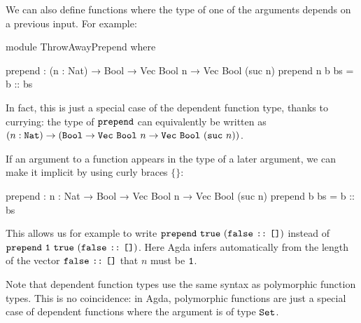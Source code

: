 \documentclass[a4paper,UKenglish]{tufte-handout}
\theoremstyle{definition}
\newcommand\prim[1]{{\AgdaPrimitive{#1}}}
\newcommand\ty[1]{{{\prim{Set}}_{#1}}}
\newcommand\fun[1]{{\AgdaFunction{#1}}}
\newcommand\data[1]{{\AgdaFunction{#1}}}
\newcommand\con[1]{{\AgdaInductiveConstructor{#1}}}
\newcommand\lit[1]{{\AgdaNumber{#1}}}
\newcommand\Nat{\data{Nat}}
\newcommand\suc{\con{suc}}
\newcommand\Bool{\data{Bool}}
\newcommand\true{\con{true}}
\newcommand\false{\con{false}}
\newcommand\nil{\con{[]}}
\newcommand\cons{\con{::}}
\begin{document}
We can also define functions where the type of one of the arguments
depends on a previous input. For example:
\begin{code}[hide]
  module ThrowAwayPrepend where
\end{code}
\begin{code}[number]
    prepend : (n : Nat) → Bool
            → Vec Bool n → Vec Bool (suc n)
    prepend n b bs = b :: bs
\end{code}
In fact, this is just a special case of the dependent function type,
thanks to currying: the type of $\fun{prepend}$ can equivalently be
written as $(n : \Nat) \to (\Bool \to \data{Vec}\ \Bool\ n \to
\data{Vec}\ \Bool\ (\suc\ n))$.

If an argument to a function appears in the type of a later argument,
we can make it implicit by using curly braces $\{\}$:
\begin{code}[number]
  prepend : {n : Nat} → Bool
          → Vec Bool n → Vec Bool (suc n)
  prepend b bs = b :: bs
\end{code}
This allows us for example to write
$\fun{prepend}\ \true\ (\false\ \cons\ \nil)$ instead of
$\fun{prepend}\ \lit{1}\ \true\ (\false\ \cons\ \nil)$. Here Agda infers
automatically from the length of the vector $\false\ \cons\ \nil$ that
$n$ must be $\lit{1}$.

Note that dependent function types use the same syntax as polymorphic
function types. This is no coincidence: in Agda, polymorphic functions
are just a special case of dependent functions where the argument is
of type $\ty{}$.
\end{document}
